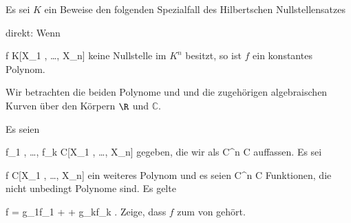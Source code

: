 {}
{





Es sei $K$ ein
Beweise den folgenden Spezialfall
des
Hilbertschen Nullstellensatzes

direkt: Wenn

\mavergleichskette
{\vergleichskette
{ f
}
{ \in }{ K[X_1 , \ldots , X_n]
}
{  }{
}
{    }{
}
{   }{
}
}
{}{}{}
keine Nullstelle im $K^n$ besitzt, so ist $f$ ein
 {} {}
konstantes Polynom.





}
{} {}

{}
{





Wir betrachten die beiden Polynome
 und
 und die zugehörigen algebraischen Kurven über den Körpern $\R$ und ${\mathbb C}$.





}
{} {}

{}
{





Es seien

\mavergleichskette
{\vergleichskette
{ f_1 , \ldots , f_k
}
{ \in }{ {\mathbb C}[X_1 , \ldots , X_n]
}
{  }{
}
{    }{
}
{   }{
}
}
{}{}{}
gegeben, die wir als
 { {\mathbb C}^n } { {\mathbb C}
} {}
auffassen. Es sei

\mavergleichskette
{\vergleichskette
{ f
}
{ \in }{ {\mathbb C}[X_1 , \ldots , X_n]
}
{  }{
}
{    }{
}
{   }{
}
}
{}{}{}
ein weiteres Polynom und es seien
 { {\mathbb C}^n } { {\mathbb C}
} {}
Funktionen, die nicht unbedingt Polynome sind. Es gelte

\mavergleichskettedisp
{\vergleichskette
{ f
}
{ =} { g_1f_1 + \cdots + g_kf_k
}
{ } {
}
{ } {
}
{ } {
}
}
{}{}{}
 {} {.}
Zeige, dass $f$ zum
von
 gehört.





}
{} {}

